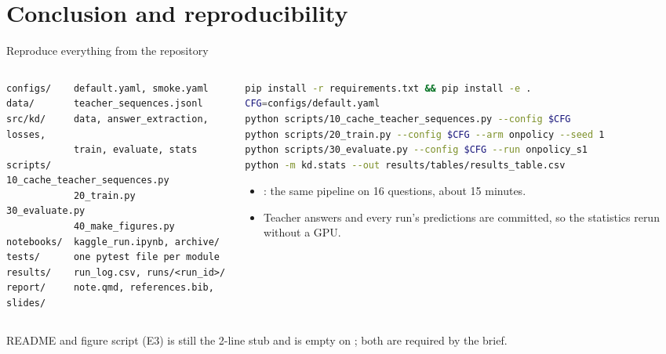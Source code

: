 \renewcommand{\sectioninfo}{Presenter: E3 \quad $\cdot$ \quad 3 minutes}
\section{Conclusion and reproducibility}

\begin{frame}[fragile]{Reproduce everything from the repository\hfill{}}
  \begin{columns}[T]
    \begin{column}{0.47\textwidth}
\begin{lstlisting}[style=kdplain]
configs/    default.yaml, smoke.yaml
data/       teacher_sequences.jsonl
src/kd/     data, answer_extraction, losses,
            train, evaluate, stats
scripts/    10_cache_teacher_sequences.py
            20_train.py   30_evaluate.py
            40_make_figures.py
notebooks/  kaggle_run.ipynb, archive/
tests/      one pytest file per module
results/    run_log.csv, runs/<run_id>/
report/     note.qmd, references.bib, slides/
\end{lstlisting}
    \end{column}
    \begin{column}{0.5\textwidth}
\begin{lstlisting}[style=kdplain,language=bash,basicstyle=\ttfamily\tiny]
pip install -r requirements.txt && pip install -e .
CFG=configs/default.yaml
python scripts/10_cache_teacher_sequences.py --config $CFG
python scripts/20_train.py --config $CFG --arm onpolicy --seed 1
python scripts/30_evaluate.py --config $CFG --run onpolicy_s1
python -m kd.stats --out results/tables/results_table.csv
\end{lstlisting}
      \footnotesize
      \begin{itemize}
        \item {}: the same pipeline on 16 questions,
              about 15 minutes.
        \item Teacher answers and every run's predictions are committed, so the
              statistics rerun without a GPU.
      \end{itemize}
    \end{column}
  \end{columns}
  \begin{todobox}{README and figure script (E3)}
     is still the 2-line stub and
     is empty on ; both are
    required by the brief.
  \end{todobox}
\end{frame}


